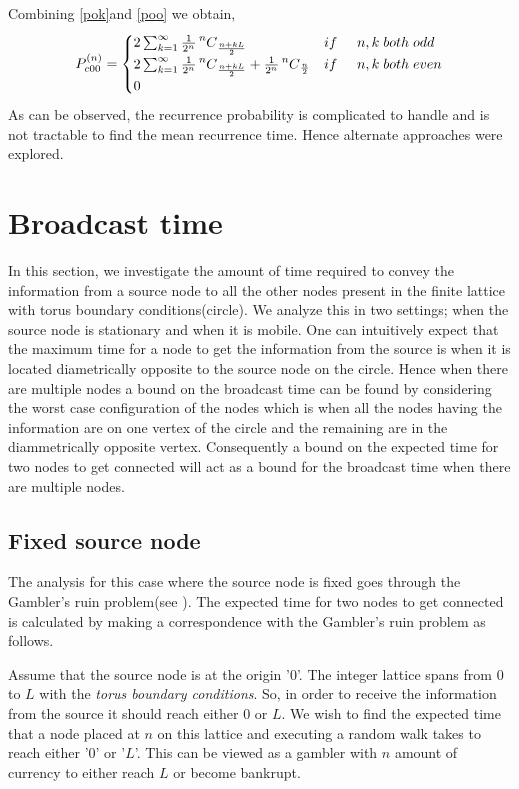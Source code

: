 \documentclass[a4paper,10pt,english]{article}
\newcommand\Mycomb[2][n]{\prescript{#1\mkern-0.5mu}{}C_{#2}}
\begin{document}
Combining \ref{pok}and \ref{poo} we obtain,
\begin{equation}
P_{c00}^{(n)} = 
\begin{cases}
2\sum_{k=1}^{\infty} \frac{1}{2^n} \Mycomb[n]{\frac{n+kL}{2}}  &if \hspace{0.5cm}n,k\hspace{0.1cm} both\hspace{0.1cm} odd\\
2\sum_{k=1}^{\infty} \frac{1}{2^n} \Mycomb[n]{\frac{n+kL}{2}} + \frac{1}{2^n} \Mycomb[n]{\frac{n}{2}}& if\hspace{0.5cm} n,k \hspace{0.1cm}both \hspace{0.1cm}even\\
0
\end{cases}
\end{equation}
As can be observed, the recurrence probability is complicated to handle and is not tractable to find the mean recurrence time. Hence alternate approaches were explored.



\section{Broadcast time}\label{bcast}
In this section, we investigate the amount of time required to convey the information from a source node to all the other nodes present in the finite lattice with torus boundary conditions(circle). We analyze this in two settings; when the source node is stationary and when it is mobile. One can intuitively expect that the maximum time for a node to get the information from the source is when it is located diametrically opposite to the source node on the circle. Hence when there are multiple nodes a bound on the broadcast time can be found by considering the worst case configuration of the nodes which is when all the nodes having the information are on one vertex of the circle and the remaining are in the diammetrically opposite vertex. Consequently a bound on the expected time for two nodes to get connected will act as a bound for the broadcast time when there are multiple nodes.

\subsection{Fixed source node}
The analysis for this case where the source node is fixed goes through the Gambler's ruin problem(see \cite{circle}). The expected time for two nodes to get connected is calculated by making a correspondence with the Gambler's ruin problem as follows.
\par  Assume that the source node is at the origin '0'. The integer lattice spans from 0 to $L$ with the \textit{torus boundary conditions}. So, in order to receive the information from the source it should reach either 0 or $L$. We wish to find the expected time that a node placed at $n$ on this lattice and executing a random walk takes to reach either '0' or '$L$'. This can be viewed as a gambler with $n$ amount of currency to either reach $L$ or become bankrupt. 
\end{document}
